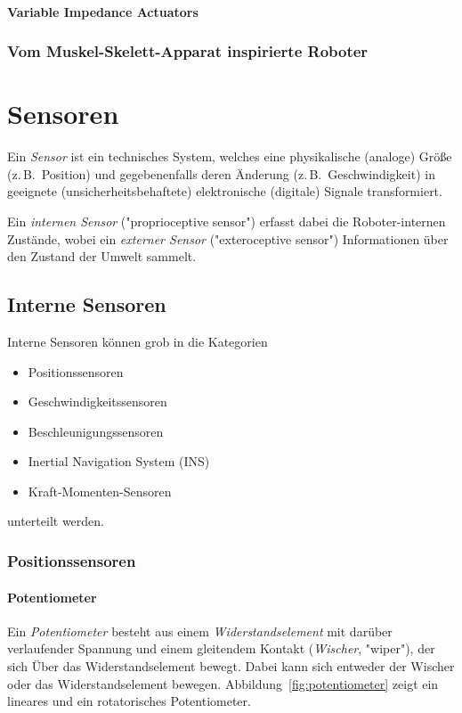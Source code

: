 \documentclass[a4paper, 11pt, accentcolor = tud3b]{tudreport}
\newcommand{\zB}{z.\,B.~}
\begin{document}
				\subsubsection{Variable Impedance Actuators} %

			\subsection{Vom Muskel-Skelett-Apparat inspirierte Roboter} %

	\chapter{Sensoren}
		Ein \emph{Sensor} ist ein technisches System, welches eine physikalische (analoge) Größe (\zB Position) und gegebenenfalls deren Änderung (\zB Geschwindigkeit) in geeignete (unsicherheitsbehaftete) elektronische (digitale) Signale transformiert.
		
		Ein \emph{internen Sensor} ("proprioceptive sensor") erfasst dabei die Roboter-internen Zustände, wobei ein \emph{externer Sensor} ("exteroceptive sensor") Informationen über den Zustand der Umwelt sammelt.
	
		\section{Interne Sensoren}
			Interne Sensoren können grob in die Kategorien
			\begin{itemize}
				\item Positionssensoren
				\item Geschwindigkeitssensoren
				\item Beschleunigungssensoren
				\item Inertial Navigation System (INS)
				\item Kraft-Momenten-Sensoren
			\end{itemize}
			unterteilt werden.

			\subsection{Positionssensoren}
				\subsubsection{Potentiometer}
					Ein \emph{Potentiometer} besteht aus einem \emph{Widerstandselement} mit darüber verlaufender Spannung und einem gleitendem Kontakt (\emph{Wischer}, "wiper"), der sich Über das Widerstandselement bewegt. Dabei kann sich entweder der Wischer oder das Widerstandselement bewegen. Abbildung~\ref{fig:potentiometer} zeigt ein lineares und ein rotatorisches Potentiometer.
					
\end{document}
